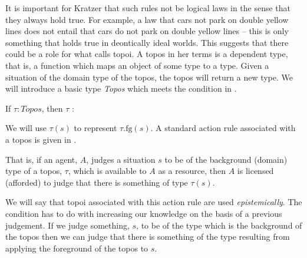 It is important for Kratzer that such rules not be logical laws in the sense
that they always hold true.  For example, a law that cars not park on
double yellow lines does not entail that cars do not park on double
yellow lines -- this is only something that holds true in deontically
ideal worlds.  This suggests that there could be a role for what
\cite{Breitholtz2014a,Breitholtzfthca} calls topoi.  A topos in her terms is a
dependent type, that is, a function which maps an object of some type
to a type.  Given a situation of the domain type of the topos, the
topos will return a new type.  We will introduce a basic type
\textit{Topos} which meets the condition in \nexteg{}.
\begin{ex} 
If $\tau:\textit{Topos}$, then $\tau$ :  
\end{ex} 
  
We will use $\tau(s)$ to represent $\tau.\text{fg}(s)$.  A standard action rule
associated with a topos is given in \nexteg{}.
\begin{ex}
  \begin{prooftree}
  \end{prooftree}
  
\label{ex:topos-license}
\end{ex} 
That is, if an agent, $A$, judges a situation $s$ to be of the
background (domain) type
of a topos, $\tau$, which is available to $A$ as a resource, then $A$
is licensed (afforded) to judge that there is something 
of type $\tau(s)$.  


We will say that topoi associated with this action rule are used
\textit{epistemically}.  The condition has to do with increasing our
knowledge on the basis of a previous judgement.  If we judge
something, $s$,
to be of the type which is the background of the topos then we can
judge that there is something of the type resulting from applying the
foreground of the topos to $s$.

